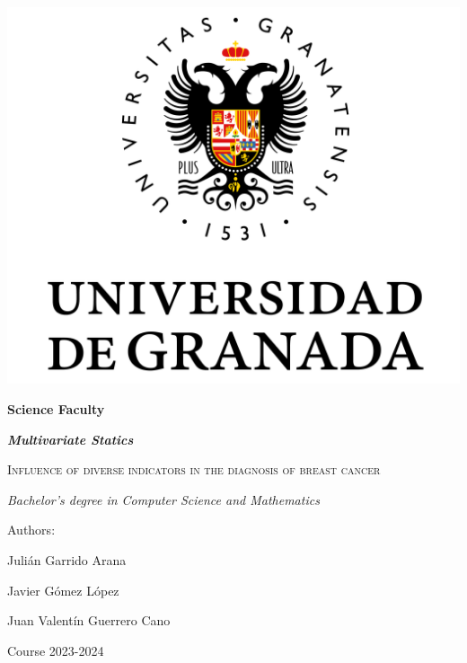 \documentclass[10pt,a4paper]{article}
\theoremstyle{definition}
\theoremstyle{definition}
\begin{document}
	
\begin{titlepage}
	\centering
	{\includegraphics[scale=0.5]{Logo_UGR.png}\par}
	\vspace{1cm}
	{\bfseries\Large Science Faculty \par}
	\vspace{0.5cm}
	{\bfseries\itshape\large Multivariate Statics \par}
	\vspace{2.5cm}
	{\scshape\Huge Influence of diverse indicators in the diagnosis of breast cancer\par}
	\vspace{3cm}
	{\itshape\Large Bachelor's degree in Computer Science and Mathematics}
	\vfill
	{\Large Authors: \par}
	{\Large Julián Garrido Arana \par}
	{\Large Javier Gómez López \par}
	{\Large Juan Valentín Guerrero Cano \par}
	
	\vfill
	{\Large Course 2023-2024 \par}
\end{titlepage}

\thispagestyle{empty}
\null
\vfill
\end{document}

